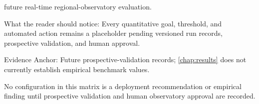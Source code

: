 \begin{landscape}
\begin{table}[htbp]
\begin{threeparttable}
\begin{tablenotes}[flushleft]
        future real-time regional-observatory evaluation.
      \item What the reader should notice: Every quantitative goal,
        threshold, and automated action remains a placeholder pending
        versioned run records, prospective validation, and human approval.
      \item Evidence Anchor: Future prospective-validation records;
        \cref{chap:results} does not currently establish empirical
        benchmark values.
      \end{tablenotes}
    \end{threeparttable}
  \end{table}

  No configuration in this matrix is a deployment recommendation or
  empirical finding until prospective validation and human observatory
  approval are recorded.
\end{landscape}
